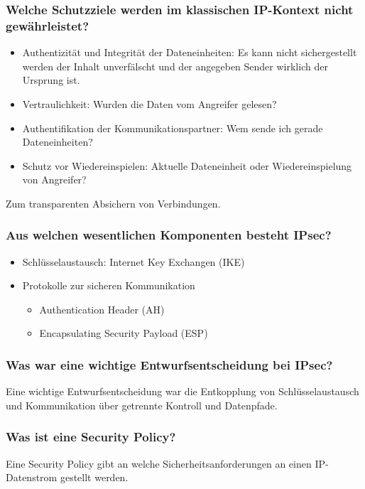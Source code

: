 		\subsubsection{Welche Schutzziele werden im klassischen IP-Kontext nicht gewährleistet?}
	\begin{itemize}
		\item Authentizität und Integrität der Dateneinheiten: Es kann nicht sichergestellt werden der Inhalt unverfälscht und der angegeben Sender wirklich der Ursprung ist.
		\item Vertraulichkeit: Wurden die Daten vom Angreifer gelesen?
		\item Authentifikation der Kommunikationspartner: Wem sende ich gerade Dateneinheiten?
		\item Schutz vor Wiedereinspielen: Aktuelle Dateneinheit oder Wiedereinspielung von Angreifer?
	\end{itemize}
	
	Zum transparenten Absichern von Verbindungen.
	
	\subsubsection{Aus welchen wesentlichen Komponenten besteht IPsec?}
	\begin{itemize}
		\item Schlüsselaustausch: Internet Key Exchangen (IKE)
		\item Protokolle zur sicheren Kommunikation
		\begin{itemize}
			\item Authentication Header (AH)
			\item Encapsulating Security Payload (ESP)
		\end{itemize}
	\end{itemize}
	
	\subsubsection{Was war eine wichtige Entwurfsentscheidung bei IPsec?}
	Eine wichtige Entwurfsentscheidung war die Entkopplung von Schlüsselaustausch und Kommunikation über getrennte Kontroll und Datenpfade.
	
	\subsubsection{Was ist eine Security Policy?}
	Eine Security Policy gibt an welche Sicherheitsanforderungen an einen IP-Datenstrom gestellt werden.
	
